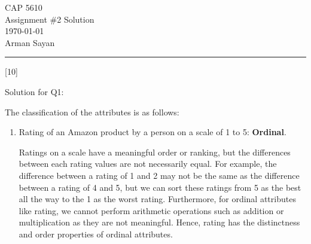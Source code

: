 \documentclass[12pt,letterpaper, onecolumn]{exam}
\begin{document}
\begingroup  
    \centering
    \LARGE CAP 5610\\
    \LARGE Assignment \#2 Solution\\[0.5em]
    \large \today\\[0.5em]
    \large Arman Sayan\par
\endgroup
\rule{\textwidth}{0.4pt}
\bracketedpoints   %
\printanswers
\renewcommand{\solutiontitle}{\noindent\textbf{Ans:}\enspace}   %
\qformat{\large \textbf{\thequestion \quad \thequestiontitle \quad [\thepoints] \hfill}}
\renewcommand{\thepartno}{\arabic{partno}}
\renewcommand{\partlabel}{\thepartno.}

\begin{questions}
    [10]

    Solution for Q1:
    

    
    \begin{solution}
        The classification of the attributes is as follows:

        \begin{enumerate}[label=(\alph*)]
            \item Rating of an Amazon product by a person on a scale of 1 to 5: \textbf{Ordinal}. 
            
            Ratings on a scale have a meaningful order or ranking, but the differences between each rating values are not necessarily equal. 
            For example, the difference between a rating of 1 and 2 may not be the same as the difference between a rating of 4 and 5, but we can sort these ratings from
            5 as the best all the way to the 1 as the worst rating.
            Furthermore, for ordinal attributes like rating, we cannot perform arithmetic operations such as addition or multiplication as they are not meaningful.
            Hence, rating has the distinctness and order properties of ordinal attributes.


\end{enumerate}
\end{solution}
\end{questions}
\end{document}

